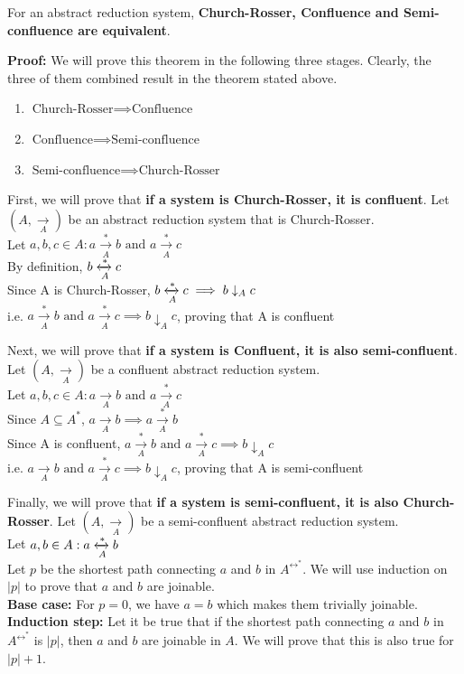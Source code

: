 \begin{theorem}
    For an abstract reduction system, \textbf{Church-Rosser, Confluence and Semi-confluence are equivalent}.
\end{theorem}

\textbf{Proof:} We will prove this theorem in the following three stages. Clearly, the three of them combined result in the theorem stated above.
\begin{enumerate}
    \item $\text{Church-Rosser} \implies \text{Confluence}$
    \item $\text{Confluence} \implies \text{Semi-confluence}$
    \item $\text{Semi-confluence} \implies \text{Church-Rosser}$
\end{enumerate}

First, we will prove that \textbf{if a system is Church-Rosser, it is confluent}. Let $(A, \xrightarrow[A]{})$ be an abstract reduction system that is Church-Rosser. \\
Let $a, b, c \in A : a \xrightarrow[A]{*} b \text{ and } a \xrightarrow[A]{*} c$ \\
By definition, $b \xleftrightarrow[A]{*} c$ \\
Since A is Church-Rosser, $b \xleftrightarrow[A]{*} c \implies b \downarrow_A c$ \\
i.e. $ a \xrightarrow[A]{*} b \text{ and } a \xrightarrow[A]{*} c \implies b \downarrow_A c$, proving that A is confluent


Next, we will prove that \textbf{if a system is Confluent, it is also semi-confluent}. Let $(A, \xrightarrow[A]{})$ be a confluent abstract reduction system. \\
Let $a, b, c \in A : a \xrightarrow[A]{} b \text{ and } a \xrightarrow[A]{*} c$ \\
Since $A \subseteq A^*$, $a \xrightarrow[A]{} b \implies a \xrightarrow[A]{*} b$ \\
Since A is confluent, $a \xrightarrow[A]{*} b \text{ and } a \xrightarrow[A]{*} c \implies b \downarrow_A c$ \\
i.e. $ a \xrightarrow[A]{} b \text{ and } a \xrightarrow[A]{*} c \implies b \downarrow_A c$, proving that A is semi-confluent

Finally, we will prove that \textbf{if a system is semi-confluent, it is also Church-Rosser}. Let $(A, \xrightarrow[A]{})$ be a semi-confluent abstract reduction system. \\
Let $a, b \in A : a \xleftrightarrow[A]{*} b$ \\
Let $p$ be the shortest path connecting $a$ and $b$ in $A^{\leftrightarrow ^*}$. We will use induction on $|p|$ to prove that $a$ and $b$ are joinable. \\
\textbf{Base case:} For $p=0$, we have $a=b$ which makes them trivially joinable. \\
\textbf{Induction step:} Let it be true that if the shortest path connecting $a$ and $b$ in $A^{\leftrightarrow ^*}$ is $|p|$, then $a$ and $b$ are joinable in $A$. We will prove that this is also true for $|p|+1$.

